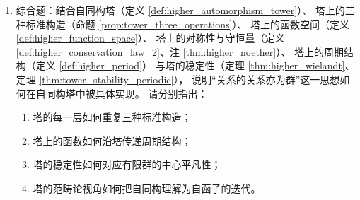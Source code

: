 \begin{enumerate}[leftmargin=3em, label=\textbf{题 \arabic*}]
    \item 综合题：结合自同构塔（定义 \ref{def:higher_automorphism_tower}）、
    塔上的三种标准构造（命题 \ref{prop:tower_three_operations}）、
    塔上的函数空间（定义 \ref{def:higher_function_space}）、
    塔上的对称性与守恒量（定义 \ref{def:higher_conservation_law_2}、注 \ref{thm:higher_noether}）、
    塔上的周期结构（定义 \ref{def:higher_period}）
    与塔的稳定性（定理 \ref{thm:higher_wielandt}、定理 \ref{thm:tower_stability_periodic}），
    说明“关系的关系亦为群”这一思想如何在自同构塔中被具体实现。
    请分别指出：
    \begin{enumerate}[label=(\roman*)]
        \item 塔的每一层如何重复三种标准构造；
        \item 塔上的函数如何沿塔传递周期结构；
        \item 塔的稳定性如何对应有限群的中心平凡性；
        \item 塔的范畴论视角如何把自同构理解为自函子的迭代。
    \end{enumerate}
\end{enumerate}

